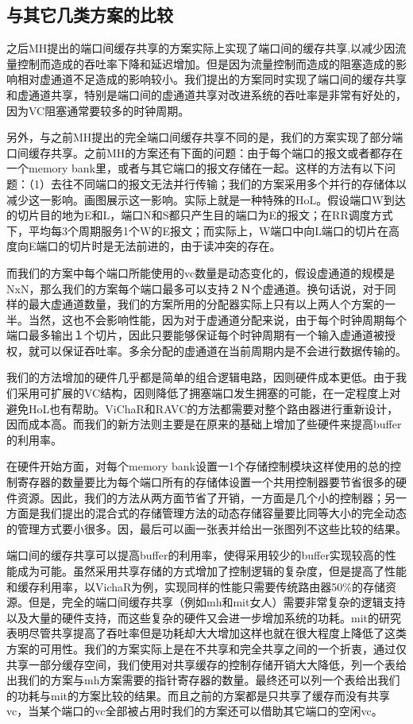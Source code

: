 ﻿\documentclass[10pt,journal]{IEEEtran}
\begin{document}
\subsection{与其它几类方案的比较}\label{comp}
之后MH提出的端口间缓存共享的方案实际上实现了端口间的缓存共享,以减少因流量控制而造成的吞吐率下降和延迟增加。但是因为流量控制而造成的阻塞造成的影响相对虚通道不足造成的影响较小。我们提出的方案同时实现了端口间的缓存共享和虚通道共享，特别是端口间的虚通道共享对改进系统的吞吐率是非常有好处的，因为VC阻塞通常要较多的时钟周期。

另外，与之前MH提出的完全端口间缓存共享不同的是，我们的方案实现了部分端口间缓存共享。之前MH的方案还有下面的问题：由于每个端口的报文或者都存在一个memory bank里，或者与其它端口的报文存储在一起。这样的方法有以下问题：（1）去往不同端口的报文无法并行传输；我们的方案采用多个并行的存储体以减少这一影响。画图展示这一影响。实际上就是一种特殊的HoL。假设端口W到达的切片目的地为E和L，端口N和S都只产生目的端口为E的报文；在RR调度方式下，平均每3个周期服务1个W的E报文；而实际上，W端口中向L端口的切片在高度向E端口的切片时是无法前进的，由于读冲突的存在。

而我们的方案中每个端口所能使用的vc数量是动态变化的，假设虚通道的规模是NxN，那么我们的方案每个端口最多可以支持２Ｎ个虚通道。换句话说，对于同样的最大虚通道数量，我们的方案所用的分配器实际上只有以上两人个方案的一半。当然，这也不会影响性能，因为对于虚通道分配来说，由于每个时钟周期每个端口最多输出１个切片，因此只要能够保证每个时钟周期有一个输入虚通道被授权，就可以保证吞吐率。多余分配的虚通道在当前周期内是不会进行数据传输的。

我们的方法增加的硬件几乎都是简单的组合逻辑电路，因则硬件成本更低。由于我们采用可扩展的VC结构，因则降低了拥塞端口发生拥塞的可能，在一定程度上对避免HoL也有帮助。ViChaR和RAVC的方法都需要对整个路由器进行重新设计，因而成本高。而我们的新方法则主要是在原来的基础上增加了些硬件来提高buffer的利用率。

在硬件开始方面，对每个memory bank设置一1个存储控制模块这样使用的总的控制寄存器的数量要比为每个端口所有的存储体设置一个共用控制器要节省很多的硬件资源。因此，我们的方法从两方面节省了开销，一方面是几个小的控制器；另一方面是我们提出的混合式的存储管理方法的动态存储容量要比同等大小的完全动态的管理方式要小很多。因，最后可以画一张表并给出一张图列不这些比较的结果。

端口间的缓存共享可以提高buffer的利用率，使得采用较少的buffer实现较高的性能成为可能。虽然采用共享存储的方式增加了控制逻辑的复杂度，但是提高了性能和缓存利用率，以VichaR为例，实现同样的性能只需要传统路由器50\%的存储资源。但是，完全的端口间缓存共享（例如mh和mit女人）需要非常复杂的逻辑支持以及大量的硬件支持，而这些复杂的硬件又会进一步增加系统的功耗。mit的研究表明尽管共享提高了吞吐率但是功耗却大大增加这样也就在很大程度上降低了这类方案的可用性。我们的方案实际上是在不共享和完全共享之间的一个折衷，通过仅共享一部分缓存空间，我们使用对共享缓存的控制存储开销大大降低，列一个表给出我们的方案与mh方案需要的指针寄存器的数量。最终还可以列一个表给出我们的功耗与mit的方案比较的结果。而且之前的方案都是只共享了缓存而没有共享vc，当某个端口的vc全部被占用时我们的方案还可以借助其它端口的空闲vc。
\end{document}
